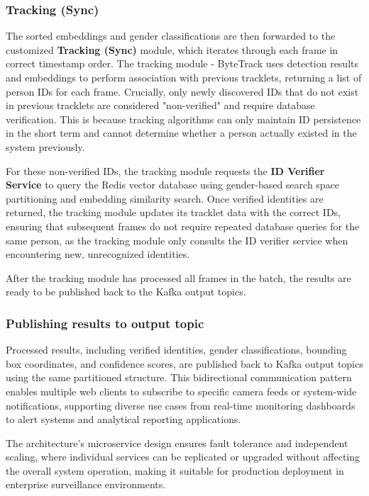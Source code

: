 \subsubsection{Tracking (Sync)}
\label{sec:tracking_sync}

The sorted embeddings and gender classifications are then forwarded to the customized \textbf{Tracking (Sync)} module, which iterates through each frame in correct timestamp order. The tracking module - ByteTrack uses detection results and embeddings to perform association with previous tracklets, returning a list of person IDs for each frame. Crucially, only newly discovered IDs that do not exist in previous tracklets are considered "non-verified" and require database verification. This is because tracking algorithms can only maintain ID persistence in the short term and cannot determine whether a person actually existed in the system previously.

For these non-verified IDs, the tracking module requests the \textbf{ID Verifier Service} to query the Redis vector database using gender-based search space partitioning and embedding similarity search. Once verified identities are returned, the tracking module updates its tracklet data with the correct IDs, ensuring that subsequent frames do not require repeated database queries for the same person, as the tracking module only consults the ID verifier service when encountering new, unrecognized identities.

After the tracking module has processed all frames in the batch, the results are ready to be published back to the Kafka output topics.

\subsubsection{Publishing results to output topic}
Processed results, including verified identities, gender classifications, bounding box coordinates, and confidence scores, are published back to Kafka output topics using the same partitioned structure. This bidirectional communication pattern enables multiple web clients to subscribe to specific camera feeds or system-wide notifications, supporting diverse use cases from real-time monitoring dashboards to alert systems and analytical reporting applications.

The architecture's microservice design ensures fault tolerance and independent scaling, where individual services can be replicated or upgraded without affecting the overall system operation, making it suitable for production deployment in enterprise surveillance environments.

